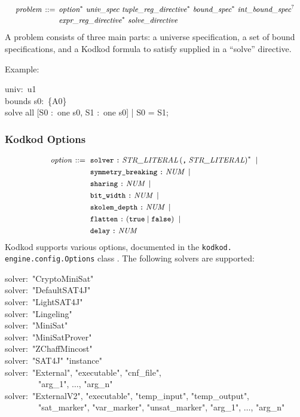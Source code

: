 \documentclass[a4paper,12pt]{article}
\begin{document}
$$\small\begin{aligned}
\textit{problem} \,::=\, {}& \textit{option}^*\
                  \textit{univ\_spec}\
                  \textit{tuple\_reg\_directive}^*\
                  \textit{bound\_spec}^*\
                  \textit{int\_bound\_spec}^? \\[-.2ex] %
                 & \textit{expr\_reg\_directive}^*\ \textit{solve\_directive}
\end{aligned}$$
%
A problem consists of three main parts: a universe specification, a set of bound
specifications, and a Kodkod formula to satisfy supplied in a ``solve''
directive.

Example:

\pre
\ttfamily\small
univ:~u1 \\
bounds s0:~\{A0\} \\
solve all [S0 :~one s0, S1 :~one s0] | S0 = S1;
\post

\subsubsection{Kodkod Options}
\label{kodkod-options}

$$\small\begin{aligned}
\textit{option} \,::=\ {}& \texttt{solver}\; \verb|:|\; \textit{STR\_LITERAL}\, (\verb|,|\; \textit{STR\_LITERAL})^*\; \mid {} \\
           & \texttt{symmetry\_breaking}\; \verb|:|\; \textit{NUM}\; \mid \\
           & \texttt{sharing}\; \verb|:|\; \textit{NUM}\; \mid \\
           & \texttt{bit\_width}\; \verb|:|\; \textit{NUM}\; \mid \\
           & \texttt{skolem\_depth}\; \verb|:|\; \textit{NUM}\; \mid \\
           & \texttt{flatten}\; \verb|:|\; (\verb|true| \mid \verb|false|)\; \mid \\
           & \texttt{delay}\; \verb|:|\; \textit{NUM}
\end{aligned}$$
%
Kodkod supports various options, documented in the \texttt{kodkod.\allowbreak
engine.\allowbreak config.\allowbreak Options} class \cite{kodkod-2009-options}.
The following solvers are supported:

\pre
\ttfamily\small
solver:~"CryptoMiniSat" \\
solver:~"DefaultSAT4J" \\
solver:~"LightSAT4J" \\
solver:~"Lingeling" \\
solver:~"MiniSat" \\
solver:~"MiniSatProver" \\
solver:~"ZChaffMincost" \\
solver:~"SAT4J" "instance" \\
solver:~"External", "executable", "cnf\_file", \\
~~~~~~~~"arg\_1", $\ldots$, "arg\_n" \\
solver:~"ExternalV2", "executable", "temp\_input", "temp\_output", \\
~~~~~~~~"sat\_marker", "var\_marker", "unsat\_marker", "arg\_1", $\ldots$, "arg\_n"
\post
\end{document}
